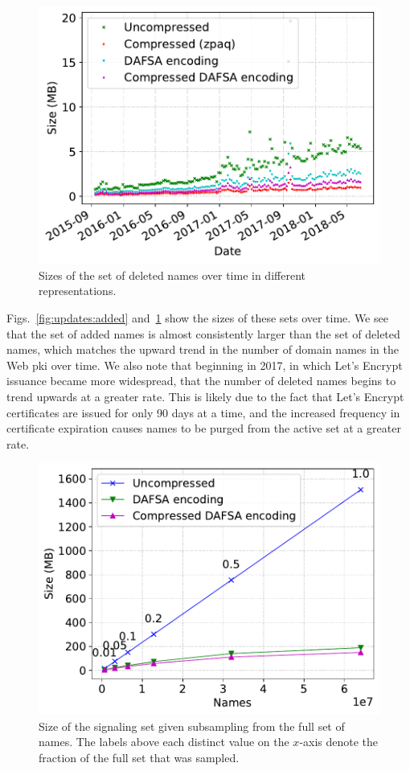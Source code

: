 \begin{figure}[t]
  \centering
  \includegraphics[width=0.95\linewidth]{fig/deleted_name_set_size}
  \caption{Sizes of the set of deleted names over time in different
  representations.}
  \label{fig:updates:deleted}
\end{figure}

Figs.~\ref{fig:updates:added} and~\ref{fig:updates:deleted} show the sizes of
these sets over time. We see that the set of added names is almost consistently
larger than the set of deleted names, which matches the upward trend in the
number of domain names in the Web \ac{pki} over time. We also note that
beginning in 2017, in which Let's Encrypt issuance became more widespread, that
the number of deleted names begins to trend upwards at a greater rate. This is
likely due to the fact that Let's Encrypt certificates are issued for only 90
days at a time, and the increased frequency in certificate expiration causes
names to be purged from the active set at a greater rate.

\begin{figure}[t]
  \centering
  \includegraphics[width=0.95\linewidth]{fig/sample}
  \caption{Size of the signaling set given subsampling from the full set of
  names. The labels above each distinct value on the $x$-axis denote the
fraction of the full set that was sampled.}
  \label{fig:sample}
\end{figure}

